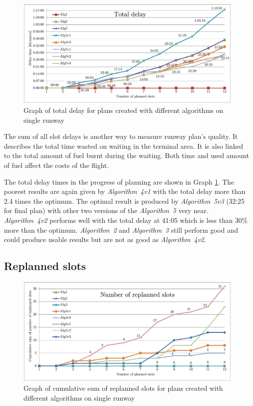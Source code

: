 \begin{figure}[h]
    \centering
    \includegraphics[width=\textwidth]{graphs/1rwy-alternating-total-delay.pdf}
    \caption{Graph of total delay for plans created with different algorithms on single runway}
    \label{graph:1rwy-alternating-total-delay}
\end{figure}

The sum of all slot delays is another way to measure runway plan's quality. It describes the total time wasted on waiting in the terminal area. It is also linked to the total amount of fuel burnt during the waiting. Both time and used amount of fuel affect the costs of the flight.

The total delay times in the progress of planning are shown in Graph \ref{graph:1rwy-alternating-total-delay}. The poorest results are again given by {\em Algorithm~4v1} with the total delay more than 2.4 times the optimum. The optimal result is produced by {\em Algorithm~5v3} (32:25 for final plan) with other two versions of the {\em Algorithm~5} very near. {\em Algorithm~4v2} performs well with the total delay at 41:05 which is less than 30\% more than the optimum. {\em Algorithm~2} and {\em Algorithm~3} still perform good and could produce usable results but are not as good as {\em Algorithm~4v2}.

\subsection{Replanned slots}

\begin{figure}[h]
    \centering
    \includegraphics[width=\textwidth]{graphs/1rwy-alternating-replanned-slots.pdf}
    \caption{Graph of cumulative sum of replanned slots for plans created with different algorithms on single runway}
    \label{graph:1rwy-alternating-replanned-slots}
\end{figure}

